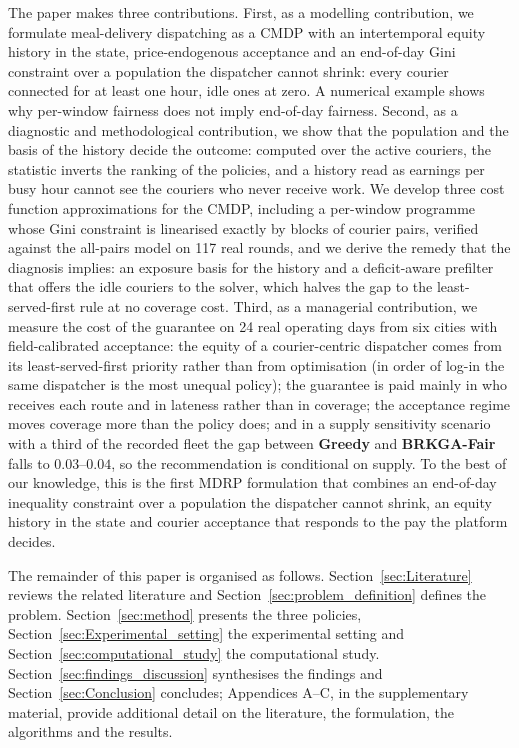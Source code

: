 \documentclass[a4paper,11pt,review,3p,authoryear]{elsarticle}
\begin{document}
The paper makes three contributions. First, as a modelling contribution, we formulate meal-delivery dispatching as a CMDP with an intertemporal equity history in the state, price-endogenous acceptance and an end-of-day Gini constraint over a population the dispatcher cannot shrink: every courier connected for at least one hour, idle ones at zero. A numerical example shows why per-window fairness does not imply end-of-day fairness. Second, as a diagnostic and methodological contribution, we show that the population and the basis of the history decide the outcome: computed over the active couriers, the statistic inverts the ranking of the policies, and a history read as earnings per busy hour cannot see the couriers who never receive work. We develop three cost function approximations for the CMDP, including a per-window programme whose Gini constraint is linearised exactly by blocks of courier pairs, verified against the all-pairs model on 117 real rounds, and we derive the remedy that the diagnosis implies: an exposure basis for the history and a deficit-aware prefilter that offers the idle couriers to the solver, which halves the gap to the least-served-first rule at no coverage cost. Third, as a managerial contribution, we measure the cost of the guarantee on 24 real operating days from six cities with field-calibrated acceptance: the equity of a courier-centric dispatcher comes from its least-served-first priority rather than from optimisation (in order of log-in the same dispatcher is the most unequal policy); the guarantee is paid mainly in who receives each route and in lateness rather than in coverage; the acceptance regime moves coverage more than the policy does; and in a supply sensitivity scenario with a third of the recorded fleet the gap between \textbf{Greedy} and \textbf{BRKGA-Fair} falls to $0.03$--$0.04$, so the recommendation is conditional on supply. To the best of our knowledge, this is the first MDRP formulation that combines an end-of-day inequality constraint over a population the dispatcher cannot shrink, an equity history in the state and courier acceptance that responds to the pay the platform decides.

The remainder of this paper is organised as follows. Section~\ref{sec:Literature} reviews the related literature and Section~\ref{sec:problem_definition} defines the problem. Section~\ref{sec:method} presents the three policies, Section~\ref{sec:Experimental_setting} the experimental setting and Section~\ref{sec:computational_study} the computational study. Section~\ref{sec:findings_discussion} synthesises the findings and Section~\ref{sec:Conclusion} concludes; Appendices A--C, in the supplementary material, provide additional detail on the literature, the formulation, the algorithms and the results.
\end{document}
